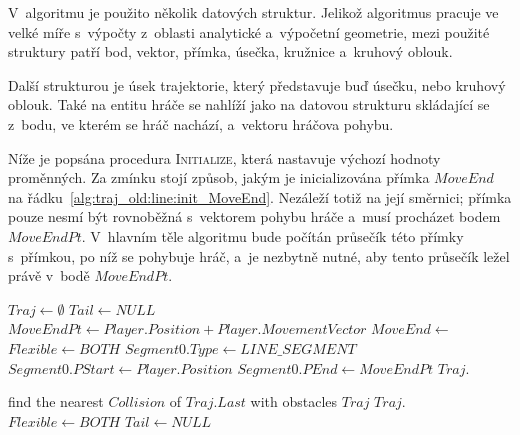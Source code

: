 V~algoritmu je použito několik datových struktur. Jelikož algoritmus pracuje ve velké míře s~výpočty z~oblasti analytické a~výpočetní geometrie, mezi použité struktury patří bod, vektor, přímka, úsečka, kružnice a~kruhový oblouk.

Další strukturou je úsek trajektorie, který představuje buď úsečku, nebo kruhový oblouk. Také na entitu hráče se nahlíží jako na datovou strukturu skládající se z~bodu, ve kterém se hráč nachází, a~vektoru hráčova pohybu.

Níže je popsána procedura \textsc{Initialize}, která nastavuje výchozí hodnoty proměnných. Za zmínku stojí způsob, jakým je inicializována přímka $MoveEnd$ na řádku~\ref{alg:traj_old:line:init_MoveEnd}. Nezáleží totiž na její směrnici; přímka pouze nesmí být rovnoběžná s~vektorem pohybu hráče a~musí procházet bodem $MoveEndPt$. V~hlavním těle algoritmu bude počítán průsečík této přímky s~přímkou, po níž se pohybuje hráč, a~je nezbytně nutné, aby tento průsečík ležel právě v~bodě $MoveEndPt$.

\begin{minipage}{\textwidth}
\begin{algorithmic}[1]
        \State $Traj \gets \emptyset$
        \State $Tail \gets NULL$
        \State $MoveEndPt \gets Player.Position + Player.MovementVector$
        \State $MoveEnd \gets$  \label{alg:traj_old:line:init_MoveEnd}
        \State $Flexible \gets BOTH$
        \State $Segment0.Type \gets LINE\_SEGMENT$
        \State $Segment0.PStart \gets Player.Position$
        \State $Segment0.PEnd \gets MoveEndPt$
        \State $Traj.$
    \EndProcedure
\end{algorithmic}
\end{minipage}

\begin{minipage}{\textwidth}
\begin{algorithmic}[1]
        \State {}
        \Loop
            \State find the nearest $Collision$ of $Traj.Last$ with obstacles
                    \State \Return $Traj$
                \Else
                    \State $Traj.$
                    \State $Flexible \gets BOTH$
                    \State $Tail \gets NULL$
                \EndIf
            \Else
            \EndIf
        \EndLoop
    \EndProcedure
\end{algorithmic}
\end{minipage}


%
